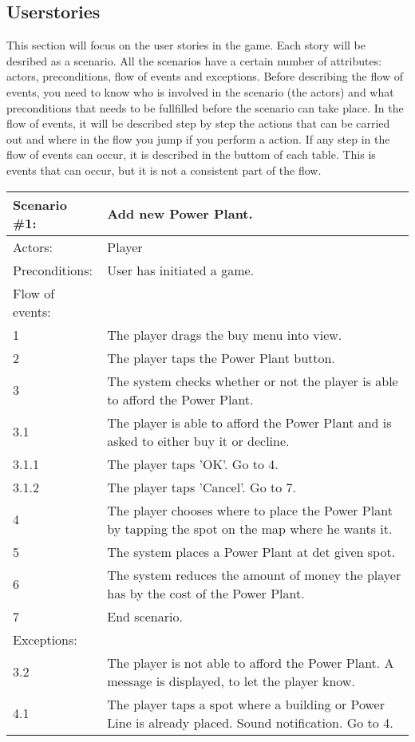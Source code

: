 \subsection{Userstories}

This section will focus on the user stories in the game. Each story will be 
desribed as a scenario. All the scenarios have a certain number of attributes:
actors, preconditions, flow of events and exceptions.
Before describing the flow of events, you need to know who is involved in the 
scenario (the actors) and what preconditions that needs to be fullfilled before
the scenario can take place. 
In the flow of events, it will be described step by step the actions that can be
carried out and where in the flow you jump if you perform a action.
If any step in the flow of events can occur, it is described in the buttom of each
table. This is events that can occur, but it is not a consistent part of the flow. \\

\begin{tabular}{| l | p{10cm} |}
	\hline
	{\bf Scenario \#1:} & {\bf Add new Power Plant.} \\ \hline
	Actors: & Player \\ \hline
	Preconditions: & User has initiated a game. \\ \hline
	Flow of events: &  \\ \hline
	1 & The player drags the buy menu into view. \\ \hline
	2 & The player taps the Power Plant button. \\ \hline
	3 & The system checks whether or not the player is able to afford the Power Plant. \\ \hline
	3.1 & The player is able to afford the Power Plant and is asked to either buy it or decline. \\ \hline
	3.1.1 & The player taps 'OK'. Go to 4. \\ \hline
	3.1.2 & The player taps 'Cancel'. Go to 7. \\ \hline
	4 & The player chooses where to place the Power Plant by tapping the spot on the map where he wants it. \\ \hline
	5 & The system places a Power Plant at det given spot. \\ \hline
	6 & The system reduces the amount of money the player has by the cost of the Power Plant. \\ \hline
	7 & End scenario. \\ \hline
	Exceptions: & \\ \hline
	3.2 & The player is not able to afford the Power Plant. A message is displayed, to let the player know. \\ \hline
	4.1 & The player taps a spot where a building or Power Line is already placed. Sound notification. Go to 4. \\ \hline
\end{tabular}

